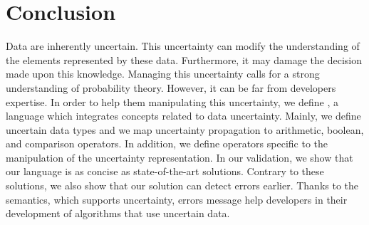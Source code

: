 \section{Conclusion}
\label{sec:aintea:conclusion}

Data are inherently uncertain.
This uncertainty can modify the understanding of the elements represented by these data.
Furthermore, it may damage the decision made upon this knowledge.
Managing this uncertainty calls for a strong understanding of probability theory.
However, it can be far from developers expertise.
In order to help them manipulating this uncertainty, we define \langName{}, a language which integrates concepts related to data uncertainty.
Mainly, we define uncertain data types and we map uncertainty propagation to arithmetic, boolean, and comparison operators.
In addition, we define operators specific to the manipulation of the uncertainty representation.
In our validation, we show that our language is as concise as state-of-the-art solutions.
Contrary to these solutions, we also show that our solution can detect errors earlier.
Thanks to the semantics, which supports uncertainty, errors message help developers in their development of algorithms that use uncertain data.